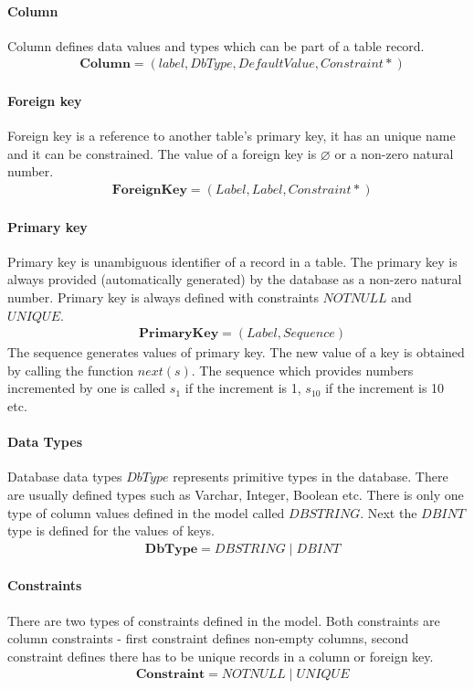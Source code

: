 \documentclass[11pt]{article}
\begin{document}
\paragraph{Column} Column defines data values and types which can be part of a table record.
\begin{align*}
&	\mathbf{Column} = (label, DbType, DefaultValue, Constraint*) 
\end{align*}

\paragraph{Foreign key} Foreign key is a reference to another table's primary key, it has an unique name and it can be constrained. The value of a foreign key is $\varnothing$ or a non-zero natural number.
\begin{align*}
&	\mathbf{ForeignKey} = (Label, Label, Constraint*) 
\end{align*}


\paragraph{Primary key} Primary key is unambiguous identifier of a record in a table. The primary key is always provided (automatically generated) by the database as a non-zero natural number. Primary key is always defined with constraints $NOTNULL$ and $UNIQUE$. 
\begin{align*}
&	\mathbf{PrimaryKey} =  ( Label, Sequence ) \end{align*}
The sequence generates values of primary key. The new value of a key is obtained by calling the function $next(s)$. The sequence which provides numbers incremented by one is called $s_1$ if the increment is 1, $s_{10}$ if the increment is 10 etc.

\paragraph{Data Types} Database data types $DbType$ represents primitive types in the database. There are usually defined types such as Varchar, Integer, Boolean etc. There is only one type of column values defined in the model called $DBSTRING$. Next the $DBINT$ type is defined for the values of keys.
\begin{align*}
&	\mathbf{DbType} = DBSTRING \; | \; DBINT
\end{align*}

\paragraph{Constraints} There are two types of constraints defined in the model. Both constraints are column constraints - first constraint defines non-empty columns, second constraint defines there has to be unique records in a column or foreign key.
\begin{align*}
&	\mathbf{Constraint} = NOTNULL \; | \; UNIQUE 
\end{align*}
\end{document}
